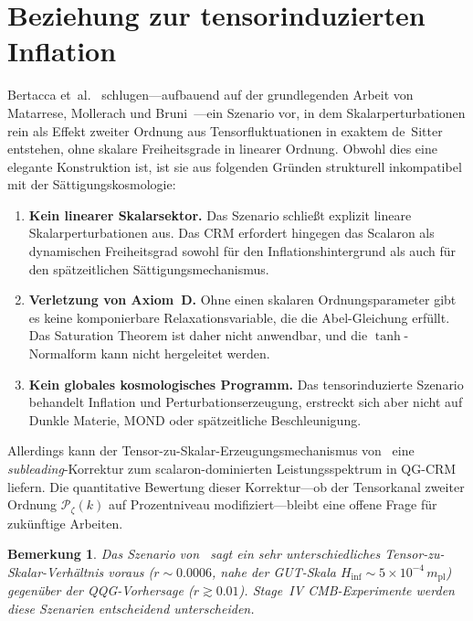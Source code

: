 \documentclass[aps,prd,twocolumn,superscriptaddress,nofootinbib]{revtex4-2}
\newtheorem{remark}{Bemerkung}
\begin{document}
\section{Beziehung zur tensorinduzierten Inflation}
\label{sec:tensor-inflation}

Bertacca et~al.~\cite{Bertacca2025} schlugen---aufbauend auf der grundlegenden Arbeit von Matarrese, Mollerach und Bruni~\cite{Matarrese1998}---ein Szenario vor, in dem Skalarperturbationen rein als Effekt zweiter Ordnung aus Tensorfluktuationen in exaktem de~Sitter entstehen, ohne skalare Freiheitsgrade in linearer Ordnung. Obwohl dies eine elegante Konstruktion ist, ist sie aus folgenden Gründen strukturell inkompatibel mit der Sättigungskosmologie:

\begin{enumerate}
\item \textbf{Kein linearer Skalarsektor.} Das Szenario schließt explizit lineare Skalarperturbationen aus. Das CRM erfordert hingegen das Scalaron als dynamischen Freiheitsgrad sowohl für den Inflationshintergrund als auch für den spätzeitlichen Sättigungsmechanismus.

\item \textbf{Verletzung von Axiom~D.} Ohne einen skalaren Ordnungsparameter gibt es keine komponierbare Relaxationsvariable, die die Abel-Gleichung erfüllt. Das Saturation Theorem ist daher nicht anwendbar, und die $\tanh$-Normalform kann nicht hergeleitet werden.

\item \textbf{Kein globales kosmologisches Programm.} Das tensorinduzierte Szenario behandelt Inflation und Perturbationserzeugung, erstreckt sich aber nicht auf Dunkle Materie, MOND oder spätzeitliche Beschleunigung.
\end{enumerate}

Allerdings kann der Tensor-zu-Skalar-Erzeugungsmechanismus von~\cite{Bertacca2025} eine \textit{subleading}-Korrektur zum scalaron-dominierten Leistungsspektrum in QG-CRM liefern. Die quantitative Bewertung dieser Korrektur---ob der Tensorkanal zweiter Ordnung $\mathcal{P}_\zeta(k)$ auf Prozentniveau modifiziert---bleibt eine offene Frage für zukünftige Arbeiten.

\begin{remark}
Das Szenario von~\cite{Bertacca2025} sagt ein sehr unterschiedliches Tensor-zu-Skalar-Verhältnis voraus ($r \sim 0.0006$, nahe der GUT-Skala $H_\mathrm{inf} \sim 5 \times 10^{-4}\,m_\mathrm{pl}$) gegenüber der QQG-Vorhersage ($r \gtrsim 0.01$). Stage~IV CMB-Experimente werden diese Szenarien entscheidend unterscheiden.
\end{remark}
\end{document}
